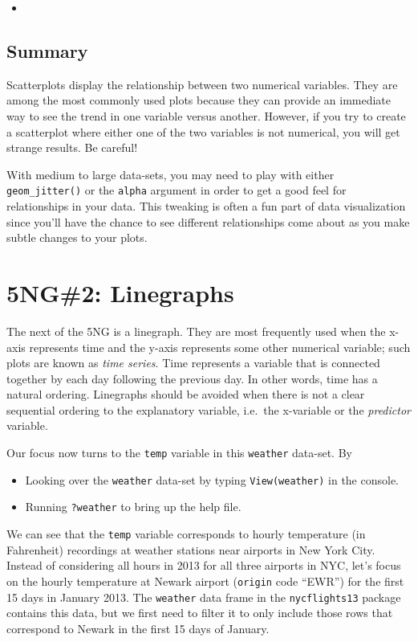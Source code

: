 \documentclass[12pt,]{krantz}
\providecommand{\tightlist}{%
  \setlength{\itemsep}{0pt}\setlength{\parskip}{0pt}}
\newenvironment{rmdblock}[1]
  {\begin{shaded*}
  \begin{itemize}
  \renewcommand{\labelitemi}{
    \raisebox{-.7\height}[0pt][0pt]{
    }
  }
  \item
  }
  {
  \end{itemize}
  \end{shaded*}
  }
\newenvironment{learncheck}
  {\begin{rmdblock}{warning}}
  {\end{rmdblock}}
\theoremstyle{definition}
\theoremstyle{definition}
\theoremstyle{definition}
\theoremstyle{remark}
\begin{document}
\begin{learncheck}

\end{learncheck}

\subsection{Summary}\label{summary}

Scatterplots display the relationship between two numerical variables.
They are among the most commonly used plots because they can provide an
immediate way to see the trend in one variable versus another. However,
if you try to create a scatterplot where either one of the two variables
is not numerical, you will get strange results. Be careful!

With medium to large data-sets, you may need to play with either
\texttt{geom\_jitter()} or the \texttt{alpha} argument in order to get a
good feel for relationships in your data. This tweaking is often a fun
part of data visualization since you'll have the chance to see different
relationships come about as you make subtle changes to your plots.

\section{5NG\#2: Linegraphs}\label{linegraphs}

The next of the 5NG is a linegraph. They are most frequently used when
the x-axis represents time and the y-axis represents some other
numerical variable; such plots are known as \emph{time series}. Time
represents a variable that is connected together by each day following
the previous day. In other words, time has a natural ordering.
Linegraphs should be avoided when there is not a clear sequential
ordering to the explanatory variable, i.e.~the x-variable or the
\emph{predictor} variable.

Our focus now turns to the \texttt{temp} variable in this
\texttt{weather} data-set. By

\begin{itemize}
\tightlist
\item
  Looking over the \texttt{weather} data-set by typing
  \texttt{View(weather)} in the console.
\item
  Running \texttt{?weather} to bring up the help file.
\end{itemize}

We can see that the \texttt{temp} variable corresponds to hourly
temperature (in Fahrenheit) recordings at weather stations near airports
in New York City. Instead of considering all hours in 2013 for all three
airports in NYC, let's focus on the hourly temperature at Newark airport
(\texttt{origin} code ``EWR'') for the first 15 days in January 2013.
The \texttt{weather} data frame in the \texttt{nycflights13} package
contains this data, but we first need to filter it to only include those
rows that correspond to Newark in the first 15 days of January.
\end{document}
